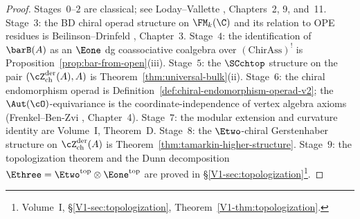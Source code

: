 \begin{proof}
Stages~$0$--$2$ are classical; see Loday--Vallette \cite{LV12},
Chapters~2, 9, and~11.
Stage~$3$: the BD chiral operad structure on $\FM_k(\C)$ and
its relation to OPE residues is Beilinson--Drinfeld
\cite{BD04}, Chapter~3.
Stage~$4$: the identification of $\barB(A)$ as an $\Eone$
dg coassociative coalgebra over $(\mathrm{ChirAss})^!$ is
Proposition~\ref{prop:bar-from-open}(iii).
Stage~$5$: the $\SCchtop$ structure on the pair
$(\cZ^{\mathrm{der}}_{\mathrm{ch}}(A), A)$ is
Theorem~\ref{thm:universal-bulk}(ii).
Stage~$6$: the chiral endomorphism operad is
Definition~\ref{def:chiral-endomorphism-operad-v2}; the
$\Aut(\cO)$-equivariance is the coordinate-independence of
vertex algebra axioms (Frenkel--Ben-Zvi \cite{FBZ04},
Chapter~4).
Stage~$7$: the modular extension and curvature identity are
Volume~I, Theorem~D.
Stage~$8$: the $\Etwo$-chiral Gerstenhaber structure on
$\cZ^{\mathrm{der}}_{\mathrm{ch}}(A)$ is
Theorem~\ref{thm:tamarkin-higher-structure}.
Stage~$9$: the topologization theorem and the Dunn decomposition
$\Ethree = \Etwo^{\mathrm{top}} \otimes \Eone^{\mathrm{top}}$ are
proved in
\S\ref*{V1-sec:topologization}\footnote{Volume~I,
\S\textup{\ref*{V1-sec:topologization}},
Theorem~\textup{\ref*{V1-thm:topologization}}.}.
\end{proof}
